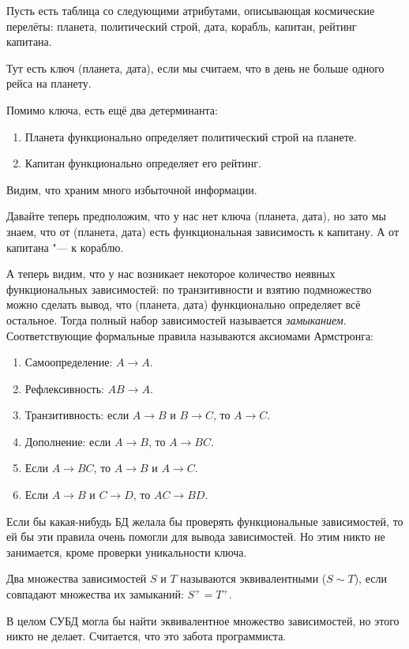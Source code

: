 	\begin{exmp}
		Пусть есть таблица со следующими атрибутами, описывающая космические перелёты:
		планета, политический строй, дата, корабль, капитан, рейтинг капитана.

		Тут есть ключ (планета, дата), если мы считаем, что в день не больше одного рейса на планету.

		Помимо ключа, есть ещё два детерминанта:
		\begin{enumerate}
			\item Планета функционально определяет политический строй на планете.
			\item Капитан функционально определяет его рейтинг.
		\end{enumerate}
	\end{exmp}
	Видим, что храним много избыточной информации.

	Давайте теперь предположим, что у нас нет ключа (планета, дата), но зато мы знаем,
	что от (планета, дата) есть функциональная зависимость к капитану.
	А от капитана "--- к кораблю.

	А теперь видим, что у нас возникает некоторое количество неявных функциональных зависимостей:
	по транзитивности и взятию подмножество можно сделать вывод, что (планета, дата) функционально
	определяет всё остальное.
	Тогда полный набор зависимостей называется \textit{замыканием}.
	Соответствующие формальные правила называются аксиомами Армстронга:
	\begin{enumerate}
		\item Самоопределение: $A \to A$.
		\item Рефлексивность: $AB \to A$.
		\item Транзитивность: если $A \to B$ и $B \to C$, то $A \to C$.
		\item Дополнение: если $A \to B$, то $A \to BC$.
		\item Если $A \to BC$, то $A \to B$ и $A \to C$.
		\item Если $A \to B$ и $C \to D$, то $AC \to BD$.
	\end{enumerate}

	Если бы какая-нибудь БД желала бы проверять функциональные зависимостей, то ей
	бы эти правила очень помогли для вывода зависимостей.
	Но этим никто не занимается, кроме проверки уникальности ключа.
	\begin{Def}
		Два множества зависимостей $S$ и $T$ называются эквивалентными ($S \sim T$),
		если совпадают множества их замыканий: $S^{+} = T^{+}$.
	\end{Def}
	В целом СУБД могла бы найти эквивалентное множество зависимостей, но этого никто не делает.
	Считается, что это забота программиста.

